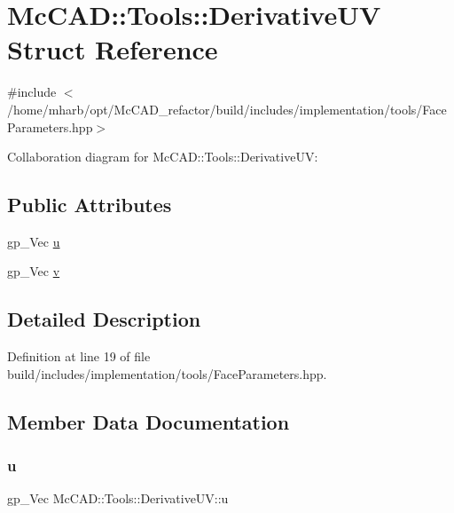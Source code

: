 \hypertarget{structMcCAD_1_1Tools_1_1DerivativeUV}{}\section{Mc\+C\+AD\+:\+:Tools\+:\+:Derivative\+UV Struct Reference}
\label{structMcCAD_1_1Tools_1_1DerivativeUV}


{\ttfamily \#include $<$/home/mharb/opt/\+Mc\+C\+A\+D\+\_\+refactor/build/includes/implementation/tools/\+Face\+Parameters.\+hpp$>$}



Collaboration diagram for Mc\+C\+AD\+:\+:Tools\+:\+:Derivative\+UV\+:
\subsection*{Public Attributes}
\begin{DoxyCompactItemize}
\item 
gp\+\_\+\+Vec \hyperlink{structMcCAD_1_1Tools_1_1DerivativeUV_a19aab39a947a67c6ed7f894ced666e47}{u}
\item 
gp\+\_\+\+Vec \hyperlink{structMcCAD_1_1Tools_1_1DerivativeUV_a05fb6a710031b3fb1ab8abd6e2fc691a}{v}
\end{DoxyCompactItemize}


\subsection{Detailed Description}


Definition at line 19 of file build/includes/implementation/tools/\+Face\+Parameters.\+hpp.



\subsection{Member Data Documentation}
\mbox{\label{structMcCAD_1_1Tools_1_1DerivativeUV_a19aab39a947a67c6ed7f894ced666e47}} 
\subsubsection{\texorpdfstring{u}{u}}
{\footnotesize\ttfamily gp\+\_\+\+Vec Mc\+C\+A\+D\+::\+Tools\+::\+Derivative\+U\+V\+::u}



